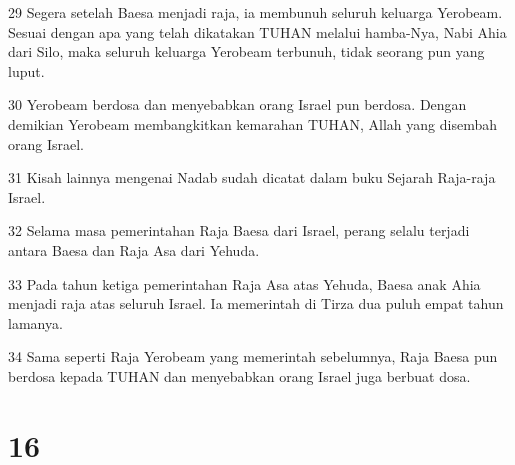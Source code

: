 \par 29 Segera setelah Baesa menjadi raja, ia membunuh seluruh keluarga Yerobeam. Sesuai dengan apa yang telah dikatakan TUHAN melalui hamba-Nya, Nabi Ahia dari Silo, maka seluruh keluarga Yerobeam terbunuh, tidak seorang pun yang luput.
\par 30 Yerobeam berdosa dan menyebabkan orang Israel pun berdosa. Dengan demikian Yerobeam membangkitkan kemarahan TUHAN, Allah yang disembah orang Israel.
\par 31 Kisah lainnya mengenai Nadab sudah dicatat dalam buku Sejarah Raja-raja Israel.
\par 32 Selama masa pemerintahan Raja Baesa dari Israel, perang selalu terjadi antara Baesa dan Raja Asa dari Yehuda.
\par 33 Pada tahun ketiga pemerintahan Raja Asa atas Yehuda, Baesa anak Ahia menjadi raja atas seluruh Israel. Ia memerintah di Tirza dua puluh empat tahun lamanya.
\par 34 Sama seperti Raja Yerobeam yang memerintah sebelumnya, Raja Baesa pun berdosa kepada TUHAN dan menyebabkan orang Israel juga berbuat dosa.

\chapter{16}

